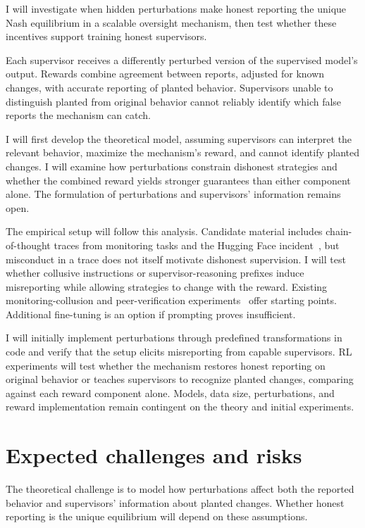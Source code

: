 \documentclass{article}
\begin{document}
I will investigate when hidden perturbations make honest reporting the unique Nash equilibrium in a scalable oversight mechanism, then test whether these incentives support training honest supervisors.

Each supervisor receives a differently perturbed version of the supervised model's output. Rewards combine agreement between reports, adjusted for known changes, with accurate reporting of planted behavior. Supervisors unable to distinguish planted from original behavior cannot reliably identify which false reports the mechanism can catch.

I will first develop the theoretical model, assuming supervisors can interpret the relevant behavior, maximize the mechanism's reward, and cannot identify planted changes. I will examine how perturbations constrain dishonest strategies and whether the combined reward yields stronger guarantees than either component alone. The formulation of perturbations and supervisors' information remains open.

The empirical setup will follow this analysis. Candidate material includes chain-of-thought traces from monitoring tasks and the Hugging Face incident~\cite{redwood2026}, but misconduct in a trace does not itself motivate dishonest supervision. I will test whether collusive instructions or supervisor-reasoning prefixes induce misreporting while allowing strategies to change with the reward. Existing monitoring-collusion and peer-verification experiments~\cite{jarviniemi2025,shi2026} offer starting points. Additional fine-tuning is an option if prompting proves insufficient.

I will initially implement perturbations through predefined transformations in code and verify that the setup elicits misreporting from capable supervisors. RL experiments will test whether the mechanism restores honest reporting on original behavior or teaches supervisors to recognize planted changes, comparing against each reward component alone. Models, data size, perturbations, and reward implementation remain contingent on the theory and initial experiments.

\section{Expected challenges and risks}

The theoretical challenge is to model how perturbations affect both the reported behavior and supervisors' information about planted changes. Whether honest reporting is the unique equilibrium will depend on these assumptions.
\end{document}
